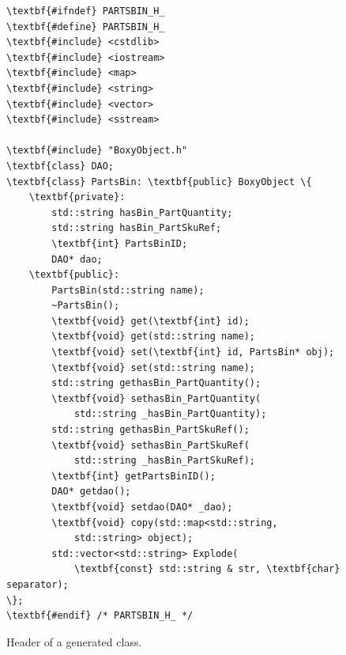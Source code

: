 \begin{figure}[t!h!]
\begin{minipage}{.45\paperwidth}
\begin{mylisting}
\begin{Verbatim}[commandchars=\\\{\},fontsize=\scriptsize, numbersep=2pt]
\textbf{#ifndef} PARTSBIN_H_
\textbf{#define} PARTSBIN_H_
\textbf{#include} <cstdlib>
\textbf{#include} <iostream>
\textbf{#include} <map>
\textbf{#include} <string>
\textbf{#include} <vector>
\textbf{#include} <sstream>

\textbf{#include} "BoxyObject.h"
\textbf{class} DAO;
\textbf{class} PartsBin: \textbf{public} BoxyObject \{
    \textbf{private}:
        std::string hasBin_PartQuantity;
        std::string hasBin_PartSkuRef;
        \textbf{int} PartsBinID;
        DAO* dao;
    \textbf{public}:
        PartsBin(std::string name);
        ~PartsBin();
        \textbf{void} get(\textbf{int} id);
        \textbf{void} get(std::string name);
        \textbf{void} set(\textbf{int} id, PartsBin* obj);
        \textbf{void} set(std::string name);
        std::string gethasBin_PartQuantity();
        \textbf{void} sethasBin_PartQuantity(
            std::string _hasBin_PartQuantity);
        std::string gethasBin_PartSkuRef();
        \textbf{void} sethasBin_PartSkuRef(
            std::string _hasBin_PartSkuRef);
        \textbf{int} getPartsBinID();
        DAO* getdao();
        \textbf{void} setdao(DAO* _dao);
        \textbf{void} copy(std::map<std::string,
            std::string> object);
        std::vector<std::string> Explode(
            \textbf{const} std::string & str, \textbf{char} separator);
\};
\textbf{#endif} /* PARTSBIN_H_ */
\end{Verbatim}
\end{mylisting}
\end{minipage}
\caption{Header of a generated class.}
\label{fig:headerclass}
\end{figure}



%



